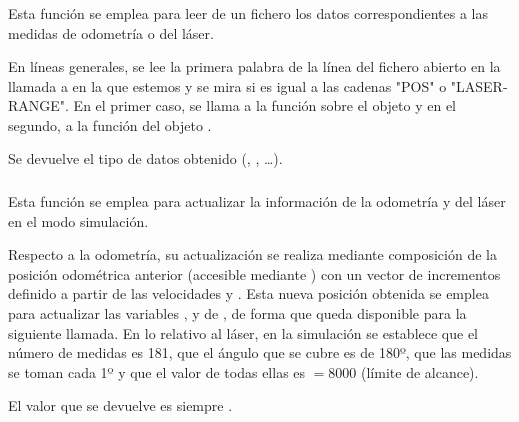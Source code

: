 \subsubsection{}

\noindent
{}

\noindent
Esta función se emplea para leer de un fichero los datos correspondientes a las medidas de odometría o del láser.

\noindent
En líneas generales, se lee la primera palabra de la línea del fichero abierto en la llamada a  en la que estemos y se mira si es igual a las cadenas "POS" o "LASER-RANGE". En el primer caso, se llama a la función  sobre el objeto  y en el segundo, a la función  del objeto .

\noindent
Se devuelve el tipo de datos obtenido (, ,  \ldots).

\subsubsection{}

\noindent
{}

\noindent
Esta función se emplea para actualizar la información de la odometría y del láser en el modo simulación.

\noindent
Respecto a la odometría, su actualización se realiza mediante composición de la posición odométrica anterior (accesible mediante ) con un vector de incrementos definido a partir de las velocidades  y . Esta nueva posición obtenida se emplea para actualizar las variables ,  y  de , de forma que queda disponible para la siguiente llamada. En lo relativo al láser, en la simulación se establece que el número de medidas es 181, que el ángulo que se cubre es de 180º, que las medidas se toman cada 1º y que el valor de todas ellas es  $= 8000$ (límite de alcance).

\noindent
El valor que se devuelve es siempre .

\subsubsection{}

\noindent
{}

